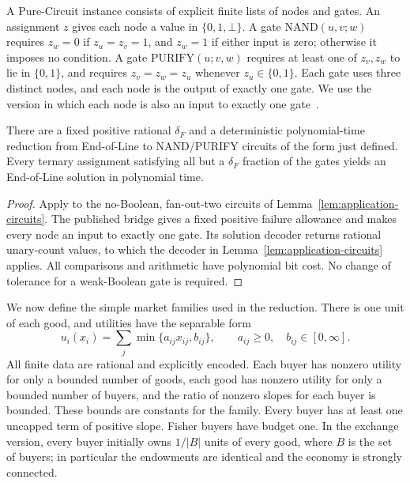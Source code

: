 A Pure-Circuit instance consists of explicit finite lists of nodes and
gates. An assignment $z$ gives each node a value in $\{0,1,\bot\}$.
A gate $\mathrm{NAND}(u,v;w)$ requires $z_w=0$ if $z_u=z_v=1$,
and $z_w=1$ if either input is zero; otherwise it imposes no condition.
A gate $\mathrm{PURIFY}(u;v,w)$ requires at least one of $z_v,z_w$
to lie in $\{0,1\}$, and requires $z_v=z_w=z_u$ whenever
$z_u\in\{0,1\}$.
Each gate uses three distinct nodes, and each node is the output of
exactly one gate. We use the version in which each node is also an input
to exactly one gate~\cite[Section~2.2.1]{Fisher2026}.

\begin{lemma}
\label{lem:application-pure-circuit}
There are a fixed positive rational $\delta_F$ and a deterministic
polynomial-time reduction from End-of-Line to NAND/PURIFY circuits of
the form just defined. Every ternary assignment satisfying all but a
$\delta_F$ fraction of the gates yields an End-of-Line solution in
polynomial time.
\end{lemma}
\begin{proof}
Apply \cite[Theorem~2.2 and Lemma~A.2]{Fisher2026} to the
no-Boolean, fan-out-two circuits of
Lemma~\ref{lem:application-circuits}. The published bridge gives a fixed positive failure allowance and makes
every node an input to exactly one gate. Its solution decoder returns
rational unary-count values, to which the decoder in
Lemma~\ref{lem:application-circuits} applies. All comparisons and
arithmetic have polynomial bit cost. No change of tolerance for a
weak-Boolean gate is required.
\end{proof}

We now define the simple market families used in the reduction.
There is one unit of each good, and utilities have the separable form
\[
 u_i(x_i)=\sum_j\min\{a_{ij}x_{ij},b_{ij}\},
 \qquad a_{ij}\geq0,\quad b_{ij}\in[0,\infty].
\]
All finite data are rational and explicitly encoded. Each buyer has
nonzero utility for only a bounded number of goods, each good has
nonzero utility for only a bounded number of buyers, and the ratio of
nonzero slopes for each buyer is bounded. These bounds are constants
for the family. Every buyer has at least one uncapped term of positive
slope. Fisher buyers have budget one. In the exchange version, every
buyer initially owns $1/|B|$ units of every good, where $B$ is the set
of buyers; in particular the endowments are identical and the economy
is strongly connected.

